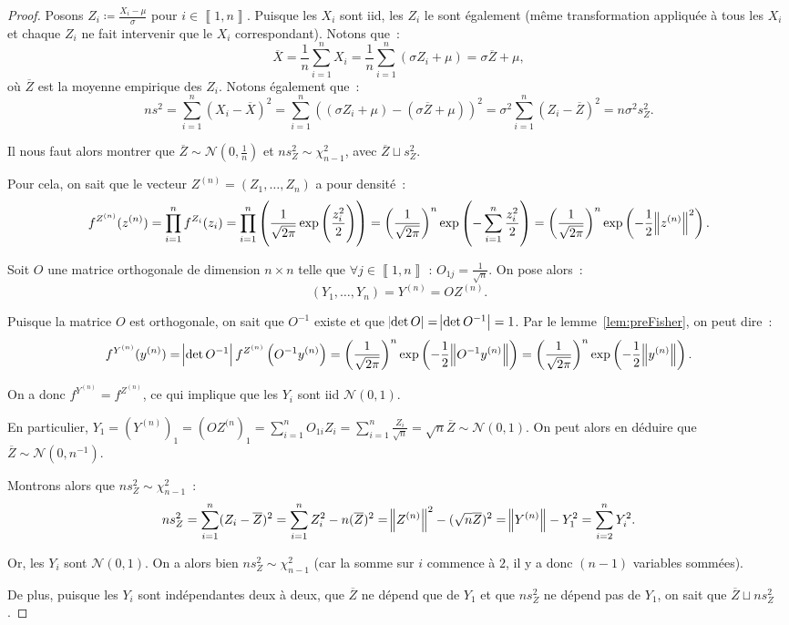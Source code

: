 \documentclass{report}
\newcommand{\Nzo}{\mathcal N(0, 1)}
\newcommand{\intint}[2]{\left\llbracket#1, #2\right\rrbracket}
\theoremstyle{definition}
\theoremstyle{remark}
\begin{document}
		\begin{proof} Posons $Z_i \coloneqq \frac {X_i - \mu}\sigma$ pour $i \in \intint 1n$. Puisque les $X_i$ sont iid, les $Z_i$ le sont également (même
		transformation appliquée à tous les $X_i$ et chaque $Z_i$ ne fait intervenir que le $X_i$ correspondant). Notons que~:
		\[\overline X = \frac 1n\sum_{i=1}^nX_i = \frac 1n\sum_{i=1}^n\left(\sigma Z_i + \mu\right) = \sigma\overline Z + \mu,\]
		où $\overline Z$ est la moyenne empirique des $Z_i$. Notons également que~:
		\[ns^2 = \sum_{i=1}^n(X_i - \overline X)^2 = \sum_{i=1}^n\left(\left(\sigma Z_i + \mu\right) - \left(\sigma\overline Z + \mu\right)\right)^2
			= \sigma^2\sum_{i=1}^n\left(Z_i - \overline Z\right)^2 = n\sigma^2s_Z^2.\]

		Il nous faut alors montrer que $\overline Z \sim \mathcal N\left(0, \frac 1n\right)$ et $ns_Z^2 \sim \chi^2_{n-1}$, avec $\overline Z \sqcup s_Z^2$.

		Pour cela, on sait que le vecteur $Z^{(n)} = (Z_1, \ldots, Z_n)$ a pour densité~:
		\[f^{Z^{(n)}}(z^{(n)}) = \prod_{i=1}^nf^{Z_i}(z_i) = \prod_{i=1}^n\left(\frac 1{\sqrt {2\pi}}\exp\left(\frac {z_i^2}2\right)\right)
			= \left(\frac 1{\sqrt {2\pi}}\right)^n\exp\left(-\sum_{i=1}^n\frac {z_i^2}2\right)
			= \left(\frac 1{\sqrt {2\pi}}\right)^n\exp\left(-\frac 12\norm {z^{(n)}}^2\right).\]

		Soit $O$ une matrice orthogonale de dimension $n \times n$ telle que $\forall j \in \intint 1n$ : $O_{1j} = \frac 1{\sqrt n}$. On pose alors~:
		\[(Y_1, \ldots, Y_n) = Y^{(n)} = OZ^{(n)}.\]

		Puisque la matrice $O$ est orthogonale, on sait que $O^{-1}$ existe et que $\abs {\det O} = \abs {\det O^{-1}} = 1$. Par le lemme~\ref{lem:preFisher},
		on peut dire~:
		\[f^{Y^{(n)}}(y^{(n)}) = \abs {\det O^{-1}}f^{Z^{(n)}}\left(O^{-1}y^{(n)}\right)
			= \left(\frac 1{\sqrt {2\pi}}\right)^n\exp\left(-\frac 12\norm {O^{-1}y^{(n)}}\right)
			= \left(\frac 1{\sqrt {2\pi}}\right)^n\exp\left(-\frac 12\norm {y^{(n)}}\right).\]

		On a donc $f^{Y^{(n)}} = f^{Z^{(n)}}$, ce qui implique que les $Y_i$ sont iid $\Nzo$.

		En particulier, $Y_1 = (Y^{(n)})_1 = (OZ^{(n})_1 = \sum_{i=1}^nO_{1i}Z_i = \sum_{i=1}^n\frac {Z_i}{\sqrt n} = \sqrt n\overline Z \sim \Nzo$.
		On peut alors en déduire que $\overline Z \sim \mathcal N(0, n^{-1})$.

		Montrons alors que $ns_Z^2 \sim \chi^2_{n-1}$~:
		\[ns_Z^2 = \sum_{i=1}^n(Z_i - \overline Z)^2 = \sum_{i=1}^nZ_i^2 - n(\overline Z)^2 = \norm {Z^{(n)}}^2 - (\sqrt n\overline Z)^2 = \norm{Y^{(n)}} - Y_1^2
			= \sum_{i=2}^nY_i^2.\]

		Or, les $Y_i$ sont $\Nzo$. On a alors bien $ns_Z^2 \sim \chi^2_{n-1}$ (car la somme sur $i$ commence à $2$, il y a donc $(n-1)$ variables sommées).

		De plus, puisque les $Y_i$ sont indépendantes deux à deux, que $\overline Z$ ne dépend que de $Y_1$ et que $ns_Z^2$ ne dépend pas de $Y_1$, on sait que
		$\overline Z \sqcup ns_Z^2$.
		\end{proof}
\end{document}
